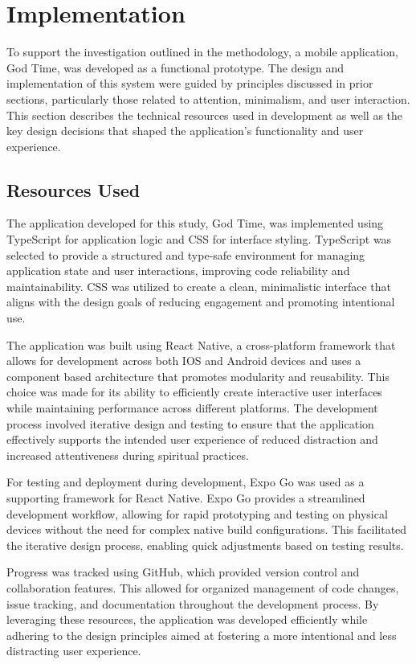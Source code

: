 \documentclass[12pt]{article}
\begin{document}
\section{Implementation}

To support the investigation outlined in the methodology, a mobile application, God Time, was developed as a functional prototype. The design and implementation of this system were guided by principles discussed in prior sections, particularly those related to attention, minimalism, and user interaction. This section describes the technical resources used in development as well as the key design decisions that shaped the application's functionality and user experience. 

\subsection{Resources Used}
The application developed for this study, God Time, was implemented using TypeScript for application logic and CSS for interface styling. TypeScript was selected to provide a structured and type-safe environment for managing application state and user interactions, improving code reliability and maintainability. CSS was utilized to create a clean, minimalistic interface that aligns with the design goals of reducing engagement and promoting intentional use.

The application was built using React Native, a cross-platform framework that allows for development across both IOS and Android devices and uses a component based architecture that promotes modularity and reusability. This choice was made for its ability to efficiently create interactive user interfaces while maintaining performance across different platforms. The development process involved iterative design and testing to ensure that the application effectively supports the intended user experience of reduced distraction and increased attentiveness during spiritual practices.

For testing and deployment during development, Expo Go was used as a supporting framework for React Native. Expo Go provides a streamlined development workflow, allowing for rapid prototyping and testing on physical devices without the need for complex native build configurations. This facilitated the iterative design process, enabling quick adjustments based on testing results.

Progress was tracked using GitHub, which provided version control and collaboration features. This allowed for organized management of code changes, issue tracking, and documentation throughout the development process. By leveraging these resources, the application was developed efficiently while adhering to the design principles aimed at fostering a more intentional and less distracting user experience.
\end{document}
